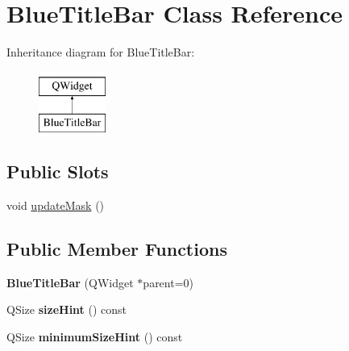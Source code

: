 \hypertarget{class_blue_title_bar}{\section{Blue\-Title\-Bar Class Reference}
\label{class_blue_title_bar}
}
Inheritance diagram for Blue\-Title\-Bar\-:\begin{figure}[H]
\begin{center}
\leavevmode
\includegraphics[height=2.000000cm]{class_blue_title_bar}
\end{center}
\end{figure}
\subsection*{Public Slots}
\begin{DoxyCompactItemize}
\item 
void \hyperlink{class_blue_title_bar_abdf4de317ce7595d8915607c4dacce44}{update\-Mask} ()
\end{DoxyCompactItemize}
\subsection*{Public Member Functions}
\begin{DoxyCompactItemize}
\item 
\hypertarget{class_blue_title_bar_ab04ab26d6f841529aa35eb04d34345ec}{{\bfseries Blue\-Title\-Bar} (Q\-Widget $\ast$parent=0)}\label{class_blue_title_bar_ab04ab26d6f841529aa35eb04d34345ec}

\item 
\hypertarget{class_blue_title_bar_a42d8bca94135de0f79e9a213fb385b44}{Q\-Size {\bfseries size\-Hint} () const }\label{class_blue_title_bar_a42d8bca94135de0f79e9a213fb385b44}

\item 
\hypertarget{class_blue_title_bar_a6212f3c1bd29270b250e7a8b83af360c}{Q\-Size {\bfseries minimum\-Size\-Hint} () const }\label{class_blue_title_bar_a6212f3c1bd29270b250e7a8b83af360c}

\end{DoxyCompactItemize}
